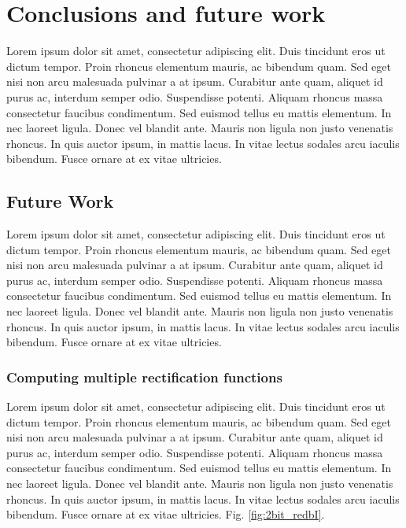 \chapter{Conclusions and future work}
\label{ch:conclusion}

Lorem ipsum dolor sit amet, consectetur adipiscing elit. Duis tincidunt eros ut dictum tempor. Proin rhoncus elementum mauris, ac bibendum quam. Sed eget nisi non arcu malesuada pulvinar a at ipsum. Curabitur ante quam, aliquet id purus ac, interdum semper odio. Suspendisse potenti. Aliquam rhoncus massa consectetur faucibus condimentum. Sed euismod tellus eu mattis elementum. In nec laoreet ligula. Donec vel blandit ante. Mauris non ligula non justo venenatis rhoncus. In quis auctor ipsum, in mattis lacus. In vitae lectus sodales arcu iaculis bibendum. Fusce ornare at ex vitae ultricies.

\section{Future Work}
Lorem ipsum dolor sit amet, consectetur adipiscing elit. Duis tincidunt eros ut dictum tempor. Proin rhoncus elementum mauris, ac bibendum quam. Sed eget nisi non arcu malesuada pulvinar a at ipsum. Curabitur ante quam, aliquet id purus ac, interdum semper odio. Suspendisse potenti. Aliquam rhoncus massa consectetur faucibus condimentum. Sed euismod tellus eu mattis elementum. In nec laoreet ligula. Donec vel blandit ante. Mauris non ligula non justo venenatis rhoncus. In quis auctor ipsum, in mattis lacus. In vitae lectus sodales arcu iaculis bibendum. Fusce ornare at ex vitae ultricies.

\subsection{Computing multiple rectification functions}

Lorem ipsum dolor sit amet, consectetur adipiscing elit. Duis tincidunt eros ut dictum tempor. Proin rhoncus elementum mauris, ac bibendum quam. Sed eget nisi non arcu malesuada pulvinar a at ipsum. Curabitur ante quam, aliquet id purus ac, interdum semper odio. Suspendisse potenti. Aliquam rhoncus massa consectetur faucibus condimentum. Sed euismod tellus eu mattis elementum. In nec laoreet ligula. Donec vel blandit ante. Mauris non ligula non justo venenatis rhoncus. In quis auctor ipsum, in mattis lacus. In vitae lectus sodales arcu iaculis bibendum. Fusce ornare at ex vitae ultricies. Fig. \ref{fig:2bit_redbI}. 

